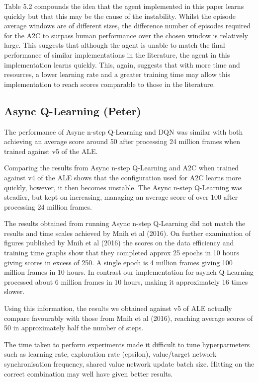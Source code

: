 \documentclass{article}
\begin{document}
Table 5.2 compounds the idea that the agent implemented in this paper learns quickly but that this may be the cause of the instability. Whilst the episode average windows are of different sizes, the difference number of episodes required for the A2C to surpass human performance over the chosen window is relatively large. This suggests that although the agent is unable to match the final performance of similar implementations in the literature, the agent in this implementation learns quickly. This, again, suggests that with more time and resources, a lower learning rate and a greater training time may allow this implementation to reach scores comparable to those in the literature.

\subsection{Async Q-Learning (Peter)}

The performance of Async n-step Q-Learning and DQN was similar with both achieving an average score around 50 after processing 24 million frames when trained against v5 of the ALE. 

Comparing the results from Async n-step Q-Learning and A2C when trained against v4 of the ALE shows that the configuration used for A2C  learns more quickly, however, it then becomes unstable. The Async n-step Q-Learning was steadier, but kept on increasing, managing an average score of over 100 after processing 24 million frames.

The results obtained from running Async n-step Q-Learning did not match the results and time scales achieved by Mnih et al (2016). On further examination of figures published by Mnih et al (2016) the scores on the data efficiency and training time graphs show that they completed approx 25 epochs in 10 hours giving scores in excess of 250. A single epoch is 4 million frames giving 100 million frames in 10 hours. In contrast our implementation for asynch Q-Learning processed about 6 million frames in 10 hours, making it approximately 16 times slower.

Using this information, the results we obtained against v5 of ALE actually compare favourably with those from Mnih et al (2016), reaching average scores of 50 in approximately half the number of steps.

The time taken to perform experiments made it difficult to tune hyperparmeters such as learning rate, exploration rate (epsilon), value/target network synchronisation frequency, shared value network update batch size. Hitting on the correct combination may well have given better results.
\end{document}
